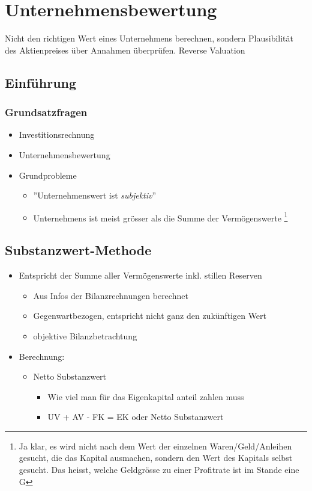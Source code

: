 
\section{Unternehmensbewertung}
Nicht den richtigen Wert eines Unternehmens berechnen, sondern Plausibilität des Aktienpreises über Annahmen überprüfen.
Reverse Valuation
\subsection{Einführung}

\subsubsection{Grundsatzfragen}
\begin{itemize}
    \item Investitionsrechnung
    \item Unternehmensbewertung
    \item Grundprobleme
    \begin{itemize}
        \item ''Unternehmenswert ist \textit{subjektiv}'' 
        \item Unternehmens ist meist grösser als die Summe der Vermögenswerte \footnote{Ja klar, es wird nicht nach dem Wert der einzelnen Waren/Geld/Anleihen gesucht, die das Kapital ausmachen, sondern den Wert des Kapitals selbst gesucht. Das heisst, welche Geldgrösse zu einer Profitrate ist im Stande eine G}
    \end{itemize}
\end{itemize}
\subsection{Substanzwert-Methode}
\begin{itemize}
    \item Entspricht der Summe aller Vermögenswerte inkl. stillen Reserven
    \begin{itemize}
        \item Aus Infos der Bilanzrechnungen berechnet
        \item Gegenwartbezogen, entspricht nicht ganz den zukünftigen Wert
        \item objektive Bilanzbetrachtung
    \end{itemize}
    \item Berechnung:
    \begin{itemize}
        \item Netto Substanzwert
        \begin{itemize}
            \item Wie viel man für das Eigenkapital anteil zahlen muss
            \item UV + AV - FK = EK oder Netto Substanzwert
        \end{itemize}
    \end{itemize}
\end{itemize}

